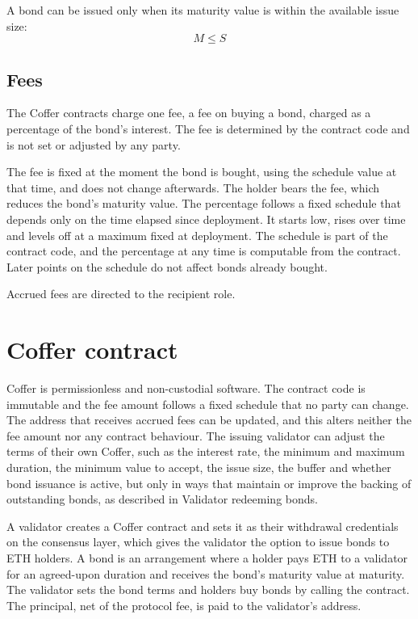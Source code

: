 \documentclass{article}
\begin{document}
A bond can be issued only when its maturity value is within the available issue size:
\[
    M \leq S
\]

\subsection{Fees}
The Coffer contracts charge one fee, a fee on buying a bond, charged as a percentage of the bond's interest. The fee is determined by the contract code and is not set or adjusted by any party.

The fee is fixed at the moment the bond is bought, using the schedule value at that time, and does not change afterwards. The holder bears the fee, which reduces the bond's maturity value. The percentage follows a fixed schedule that depends only on the time elapsed since deployment. It starts low, rises over time and levels off at a maximum fixed at deployment. The schedule is part of the contract code, and the percentage at any time is computable from the contract. Later points on the schedule do not affect bonds already bought.

Accrued fees are directed to the recipient role.

\section{Coffer contract}

Coffer is permissionless and non-custodial software. The contract code is immutable and the fee amount follows a fixed schedule that no party can change. The address that receives accrued fees can be updated, and this alters neither the fee amount nor any contract behaviour. The issuing validator can adjust the terms of their own Coffer, such as the interest rate, the minimum and maximum duration, the minimum value to accept, the issue size, the buffer and whether bond issuance is active, but only in ways that maintain or improve the backing of outstanding bonds, as described in Validator redeeming bonds.

A validator creates a Coffer contract and sets it as their withdrawal credentials on the consensus layer, which gives the validator the option to issue bonds to ETH holders. A bond is an arrangement where a holder pays ETH to a validator for an agreed-upon duration and receives the bond's maturity value at maturity. The validator sets the bond terms and holders buy bonds by calling the contract. The principal, net of the protocol fee, is paid to the validator's address.
\end{document}
